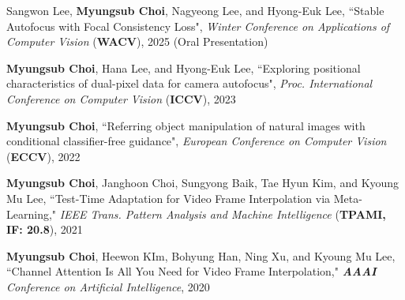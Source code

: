 \clearpage
{}


\begin{cventries}

\cventry{}{}{}{}
{ \vspace*{-3mm}
\begin{cvitems}
    \item Sangwon Lee, \textbf{Myungsub Choi}, Nagyeong Lee, and Hyong-Euk Lee, {``Stable Autofocus with Focal Consistency Loss"}, \textit{Winter Conference on Applications of Computer Vision} (\textbf{WACV}), 2025 (Oral Presentation)
    \item \textbf{Myungsub Choi}, Hana Lee, and Hyong-Euk Lee, ``Exploring positional characteristics of dual-pixel data for camera autofocus", \textit{Proc. International Conference on Computer Vision} (\textbf{ICCV}), 2023
    \item \textbf{Myungsub Choi}, ``Referring object manipulation of natural images with conditional classifier-free guidance", \textit{European Conference on Computer Vision} (\textbf{ECCV}), 2022
    \item \textbf{Myungsub Choi}, Janghoon Choi, Sungyong Baik, Tae Hyun Kim, and Kyoung Mu Lee, ``Test-Time Adaptation for Video Frame Interpolation via Meta-Learning," \textit{IEEE Trans. Pattern Analysis and Machine Intelligence} (\textbf{TPAMI, IF: 20.8}), 2021
    \item \textbf{Myungsub Choi}, Heewon KIm, Bohyung Han, Ning Xu, and Kyoung Mu Lee, ``Channel Attention Is All You Need for Video Frame Interpolation," \textit{\textbf{AAAI} Conference on Artificial Intelligence}, 2020
\end{cvitems}
}   


\end{cventries}
